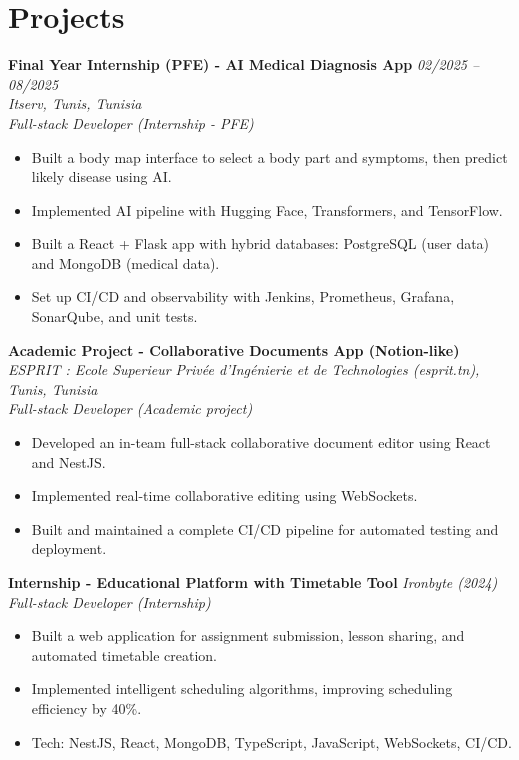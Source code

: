 \documentclass[11pt,a4paper]{article}
\begin{document}
\section*{Projects}
\textbf{Final Year Internship (PFE) - AI Medical Diagnosis App} \hfill \textit{02/2025 -- 08/2025}\\
\textit{Itserv, Tunis, Tunisia}\\
\textit{Full-stack Developer (Internship - PFE)}
\begin{itemize}[leftmargin=12pt,itemsep=2pt]
  \item Built a body map interface to select a body part and symptoms, then predict likely disease using AI.
  \item Implemented AI pipeline with Hugging Face, Transformers, and TensorFlow.
  \item Built a React + Flask app with hybrid databases: PostgreSQL (user data) and MongoDB (medical data).
  \item Set up CI/CD and observability with Jenkins, Prometheus, Grafana, SonarQube, and unit tests.
\end{itemize}

\textbf{Academic Project - Collaborative Documents App (Notion-like)} \hfill \textit{ESPRIT : Ecole Superieur Privée d'Ingénierie et de Technologies (esprit.tn), Tunis, Tunisia}\\
\textit{Full-stack Developer (Academic project)}
\begin{itemize}[leftmargin=12pt,itemsep=2pt]
  \item Developed an in-team full-stack collaborative document editor using React and NestJS.
  \item Implemented real-time collaborative editing using WebSockets.
  \item Built and maintained a complete CI/CD pipeline for automated testing and deployment.
\end{itemize}

\textbf{Internship - Educational Platform with Timetable Tool} \hfill \textit{Ironbyte (2024)}\\
\textit{Full-stack Developer (Internship)}
\begin{itemize}[leftmargin=12pt,itemsep=2pt]
  \item Built a web application for assignment submission, lesson sharing, and automated timetable creation.
  \item Implemented intelligent scheduling algorithms, improving scheduling efficiency by 40\%.
  \item Tech: NestJS, React, MongoDB, TypeScript, JavaScript, WebSockets, CI/CD.
\end{itemize}
\end{document}
